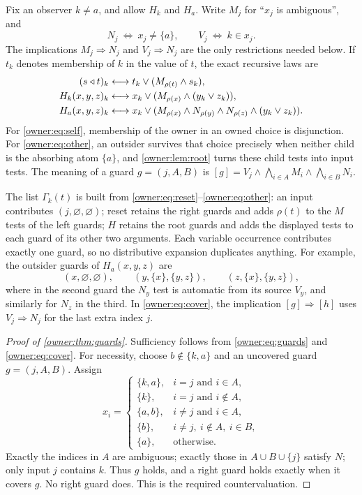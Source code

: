 Fix an observer $k\ne a$, and allow $H_k$ and $H_a$. Write $M_j$ for ``$x_j$ is ambiguous'', and
\[
 N_j\ \Longleftrightarrow\ x_j\ne\{a\},\qquad
 V_j\ \Longleftrightarrow\ k\in x_j.
\]
The implications $M_j\Rightarrow N_j$ and $V_j\Rightarrow N_j$ are the only restrictions needed below. If $t_k$ denotes membership of $k$ in the value of $t$, the exact recursive laws are
\begin{align}
 (s\mathbin{\triangleleft} t)_k
   &\longleftrightarrow t_k\lor(M_{\rho(t)}\land s_k),\label{owner:eq:reset}\\
 H_k(x,y,z)_k
   &\longleftrightarrow x_k\lor
        (M_{\rho(x)}\land(y_k\lor z_k)),\label{owner:eq:self}\\
 H_a(x,y,z)_k
   &\longleftrightarrow x_k\lor
        (M_{\rho(x)}\land N_{\rho(y)}\land N_{\rho(z)}
                     \land(y_k\lor z_k)).\label{owner:eq:other}
\end{align}
For \eqref{owner:eq:self}, membership of the owner in an owned choice is disjunction. For \eqref{owner:eq:other}, an outsider survives that choice precisely when neither child is the absorbing atom $\{a\}$, and \cref{owner:lem:root} turns these child tests into input tests. The meaning of a guard $g=(j,A,B)$ is
$[g]=V_j\land\bigwedge_{i\in A}M_i\land\bigwedge_{i\in B}N_i$.

The list $\Gamma_k(t)$ is built from \eqref{owner:eq:reset}--\eqref{owner:eq:other}: an input contributes $(j,\varnothing,\varnothing)$; reset retains the right guards and adds $\rho(t)$ to the $M$ tests of the left guards; $H$ retains the root guards and adds the displayed tests to each guard of its other two arguments.
Each variable occurrence contributes exactly one guard, so no distributive expansion duplicates anything. For example, the outsider guards of $H_a(x,y,z)$ are
\[
 (x,\varnothing,\varnothing),\qquad
 (y,\{x\},\{y,z\}),\qquad (z,\{x\},\{y,z\}),
\]
where in the second guard the $N_y$ test is automatic from its source $V_y$, and similarly for $N_z$ in the third. In \eqref{owner:eq:cover}, the implication $[g]\Rightarrow[h]$ uses $V_j\Rightarrow N_j$ for the last extra index $j$.

\begin{proof}[Proof of \cref{owner:thm:guards}]
Sufficiency follows from \eqref{owner:eq:guards} and
\eqref{owner:eq:cover}. For necessity, choose $b\notin\{k,a\}$ and
an uncovered guard $g=(j,A,B)$. Assign
\[
 x_i=\begin{cases}
 \{k,a\},&i=j\text{ and }i\in A,\\
 \{k\},&i=j\text{ and }i\notin A,\\
 \{a,b\},&i\ne j\text{ and }i\in A,\\
 \{b\},&i\ne j,\ i\notin A,\ i\in B,\\
 \{a\},&\text{otherwise}.
 \end{cases}
\]
Exactly the indices in $A$ are ambiguous; exactly those in
$A\cup B\cup\{j\}$ satisfy $N$; only input $j$ contains $k$.
Thus $g$ holds, and a right guard holds exactly when it covers $g$.
No right guard does. This is the required countervaluation.
\end{proof}

